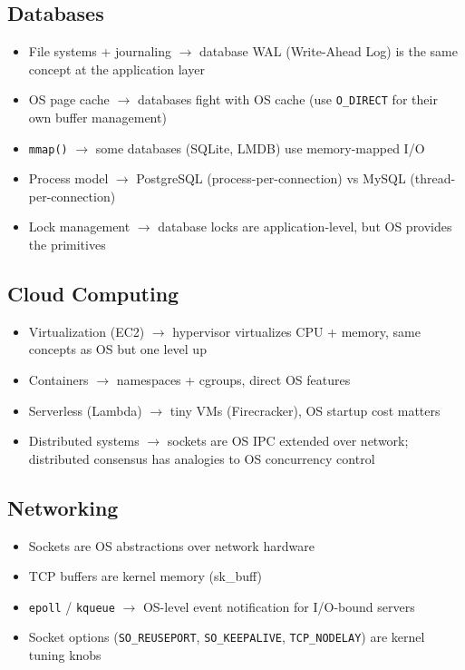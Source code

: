 \documentclass[11pt]{article}
\providecommand{\tightlist}{\setlength{\itemsep}{1pt}\setlength{\parskip}{0pt}}
\begin{document}
\subsection{Databases}\label{databases}

\begin{itemize}
\tightlist
\item
  File systems + journaling \(\rightarrow\) database WAL (Write-Ahead Log) is the same concept at the application layer
\item
  OS page cache \(\rightarrow\) databases fight with OS cache (use \texttt{O\_DIRECT} for their own buffer management)
\item
  \texttt{mmap()} \(\rightarrow\) some databases (SQLite, LMDB) use memory-mapped I/O
\item
  Process model \(\rightarrow\) PostgreSQL (process-per-connection) vs MySQL (thread-per-connection)
\item
  Lock management \(\rightarrow\) database locks are application-level, but OS provides the primitives
\end{itemize}

\subsection{Cloud Computing}\label{cloud-computing}

\begin{itemize}
\tightlist
\item
  Virtualization (EC2) \(\rightarrow\) hypervisor virtualizes CPU + memory, same concepts as OS but one level up
\item
  Containers \(\rightarrow\) namespaces + cgroups, direct OS features
\item
  Serverless (Lambda) \(\rightarrow\) tiny VMs (Firecracker), OS startup cost matters
\item
  Distributed systems \(\rightarrow\) sockets are OS IPC extended over network; distributed consensus has analogies to OS concurrency control
\end{itemize}

\subsection{Networking}\label{networking}

\begin{itemize}
\tightlist
\item
  Sockets are OS abstractions over network hardware
\item
  TCP buffers are kernel memory (sk\_buff)
\item
  \texttt{epoll} / \texttt{kqueue} \(\rightarrow\) OS-level event notification for I/O-bound servers
\item
  Socket options (\texttt{SO\_REUSEPORT}, \texttt{SO\_KEEPALIVE}, \texttt{TCP\_NODELAY}) are kernel tuning knobs
\end{itemize}
\end{document}
